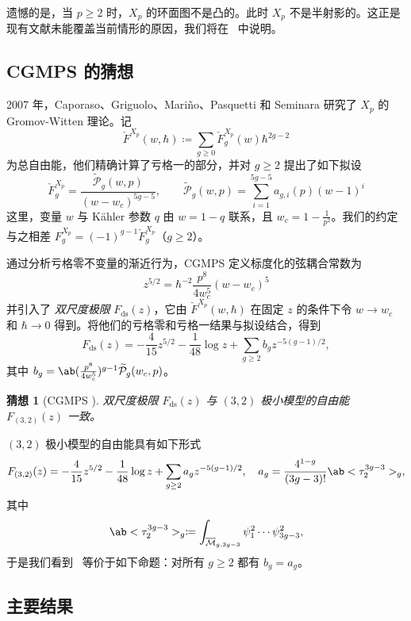 \documentclass{amsart}
\newtheorem{conj}[thm]{猜想}
\theoremstyle{definition}
\theoremstyle{remark}
\theoremstyle{plain}
\theoremstyle{definition}
\theoremstyle{remark}
\newcommand{\Mbar}{\overline{\mathcal{M}}}
\newcommand{\mc}[1]{\mathcal{#1}}
\newcommand{\mr}[1]{\mathrm{#1}}
\newcommand{\wt}[1]{\widetilde{#1}}
\newcommand{\1}{\mathbf{1}}
\newcommand{\2}{\mathbf{2}}
\newcommand{\3}{\mathbf{3}}
\begin{document}
遗憾的是，当 \(p \geq 2\) 时，\(X_p\) 的环面图不是凸的。此时 \(X_p\) 不是半射影的。这正是现有文献未能覆盖当前情形的原因，我们将在~ 中说明。

\subsection{CGMPS 的猜想}%
\label{sub:The conjecture of CGMPS}

2007 年，Caporaso、Griguolo、Mari\~{n}o、Pasquetti 和 Seminara 研究了 \(X_p\) 的 Gromov-Witten 理论。记
\[ \check{F}^{X_p}(w,\hbar) \coloneqq \sum_{g \geq 0} \check{F}_g^{X_p}(w) \hbar^{2g-2} \]
为总自由能，他们精确计算了亏格一的部分，并对 \(g \geq 2\) 提出了如下拟设
\begin{equation}\label{eqn:cgmps ansatz}
    \check{F}_g^{X_p} = \frac{\wt{\mc{P}}_g(w,p)}{(w-w_c)^{5g-5}}, \qquad \wt{\mc{P}}_g(w,p) = \sum_{i=1}^{5g-5} a_{g,i}(p)(w-1)^i
\end{equation}
这里，变量 \(w\) 与 Kähler 参数 \(q\) 由 \(w = 1-q\) 联系，且 \(w_c = 1 - \frac{1}{p^2}\)。我们的约定与之相差 \(F_g^{X_p} = (-1)^{g-1}\check{F}_g^{X_p}\)（\(g \geq 2\)）。

通过分析亏格零不变量的渐近行为，CGMPS 定义标度化的弦耦合常数为
\[ z^{5/2} = \hbar^{-2} \frac{p^8}{4w_c^5}(w-w_c)^5 \]
并引入了 \textit{双尺度极限} \(F_{\mr{ds}}(z)\)，它由 \(\check{F}^{X_p}(w,\hbar)\) 在固定 \(z\) 的条件下令 \(w \to w_c\) 和 \(\hbar \to 0\) 得到。将他们的亏格零和亏格一结果与拟设结合，得到
\[ F_{\mr{ds}}(z) = -\frac{4}{15}z^{5/2} - \frac{1}{48}\log z + \sum_{g \geq 2} b_g z^{-5(g-1)/2}, \]
其中 \(b_g = \ab(\frac{p^8}{4w_c^5})^{g-1}\wt{\mc{P}}_g(w_c,p)\)。

\begin{conj}[CGMPS {\cite{CGMPS2007}}]%
\label{conj:cgmps}
    双尺度极限 \(F_{\mr{ds}}(z)\) 与 \((3,2)\) 极小模型的自由能 \(F_{(3,2)}(z)\) 一致。
\end{conj}

\((3,2)\) 极小模型的自由能具有如下形式
\[ F_{(3,2)}(z) = -\frac{4}{15}z^{5/2} - \frac{1}{48}\log z + \sum_{g\geq2} a_g z^{-5(g-1)/2}, \quad a_g = \frac{4^{1-g}}{(3g-3)!}\ab<\tau_2^{3g-3}>_g, \]
其中
\[ \ab<\tau_2^{3g-3}>_g \coloneqq \int_{\Mbar_{g,3g-3}} \psi_1^2 \cdots \psi_{3g-3}^2, \]
于是我们看到~ 等价于如下命题：对所有 \(g \geq 2\) 都有 \(b_g = a_g\)。

\subsection{主要结果}%
\label{sub:The main results (Guo local P1)}
\end{document}
